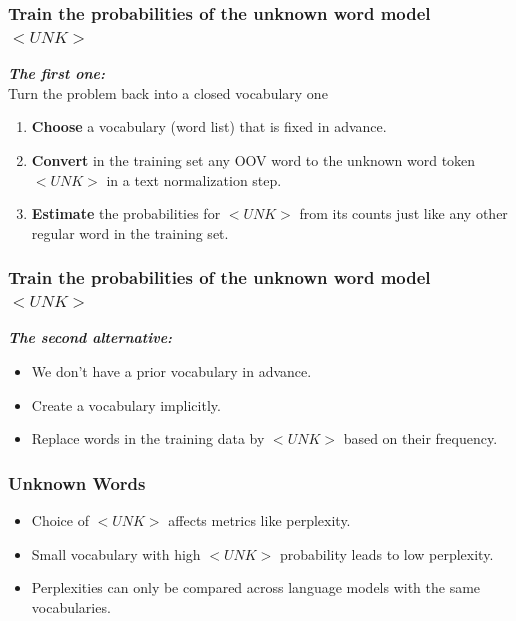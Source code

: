 \documentclass[13.5pt,aspecratio=169]{beamer}
\begin{document}
    
    \begin{frame}
            \frametitle{Train the probabilities of the unknown word model $<UNK>$}
        \textit{\textbf{The first one:}} \\
            Turn the problem back into a closed vocabulary one
            \pause
                \begin{enumerate}
                    \item \textbf{Choose} a vocabulary (word list) that is fixed in advance.
                    \pause
                    \item \textbf{Convert} in the training set any OOV word to the unknown word token $<UNK>$ in a text normalization step.
                    \pause
                    \item \textbf{Estimate} the probabilities for $<UNK>$ from its counts just like any other regular word in the training set.
                \end{enumerate}
    \end{frame}
    
    
    \begin{frame}
            \frametitle{Train the probabilities of the unknown word model $<UNK>$}
        \textit{\textbf{The second alternative:}} \\
            \begin{itemize}
                \item We don’t have a prior vocabulary in advance.
                \item Create a vocabulary implicitly.
                \item Replace words in the training data by $<UNK>$ based on their frequency.
            \end{itemize}
    \end{frame}
    
    
    \begin{frame}
        \frametitle{Unknown Words}
        \begin{itemize}
            \item Choice of $<UNK>$ affects metrics like perplexity.
            \item Small vocabulary with high $<UNK>$ probability leads to low perplexity.
            \item Perplexities can only be compared across language models with the same vocabularies.
        \end{itemize}
    \end{frame}
\end{document}
